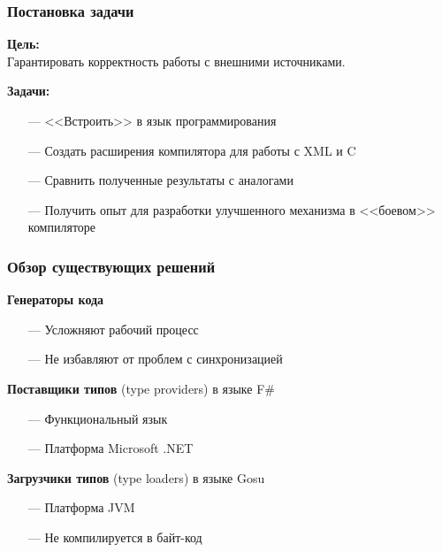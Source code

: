 \documentclass[12pt]{beamer}
\newcommand{\nl}{\vspace{\baselineskip}}
\begin{document}
\begin{frame}\frametitle{Постановка задачи}
\begin{large}
    \linespread{1}
    \textbf{Цель:}\\
    Гарантировать корректность работы с внешними источниками.

    \textbf{Задачи:}
    \begin{itemize}
        \item[---] {<<Встроить>>} в язык программирования
        \item[---] Создать расширения компилятора для работы с XML и C
        \item[---] Сравнить полученные результаты с аналогами
        \item[---] Получить опыт для разработки улучшенного механизма в {<<боевом>>} компиляторе
    \end{itemize}


    \linespread{1}
\end{large}
\end{frame}

\begin{frame}\frametitle{Обзор существующих решений} %
\begin{large}
    \textbf{Генераторы кода}
    \begin{itemize}
        \item[---] Усложняют рабочий процесс
        \item[---] Не избавляют от проблем с синхронизацией
    \end{itemize}
    \nl
    \textbf{Поставщики типов} (type providers) в языке F\#
    \begin{itemize}
        \item[---] Функциональный язык
        \item[---] Платформа Microsoft .NET
    \end{itemize}
    \nl
    \textbf{Загрузчики типов} (type loaders) в языке Gosu
    \begin{itemize}
        \item[---] Платформа JVM
        \item[---] Не компилируется в байт-код
    \end{itemize}
\end{large}
\end{frame}
\end{document}
